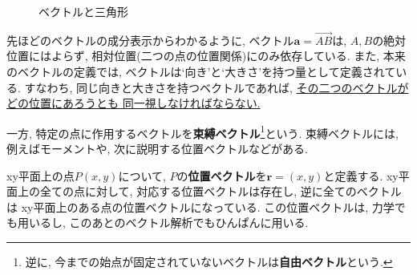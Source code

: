         \begin{figure}[h]
            \centering
            \caption{ベクトルと三角形} \label{fig:線形代数:内積の証明用}
        \end{figure}

        先ほどのベクトルの成分表示からわかるように, ベクトル$\bm{a}=\overrightarrow{AB}$は, $A,B$の絶対位置にはよらず, 相対位置(二つの点の位置関係)にのみ依存している.
        また, 本来のベクトルの定義では, ベクトルは`向き'と`大きさ'を持つ量として定義されている. すなわち, 同じ向きと大きさを持つベクトルであれば, \underline{その二つのベクトルがどの位置にあろうとも
        同一視しなければならない.}

        一方, 特定の点に作用するベクトルを\textbf{束縛ベクトル}\footnote{逆に, 今までの始点が固定されていないベクトルは\textbf{自由ベクトル}という.}という. 束縛ベクトルには, 例えばモーメントや, 次に説明する位置ベクトルなどがある.

        xy平面上の点$P(x,y)$について, $P$の\textbf{位置ベクトル}を$\bm{r}=(x,y)$と定義する. xy平面上の全ての点に対して, 対応する位置ベクトルは存在し, 逆に全てのベクトルは
        xy平面上のある点の位置ベクトルになっている. この位置ベクトルは, 力学でも用いるし, このあとのベクトル解析でもひんぱんに用いる.

